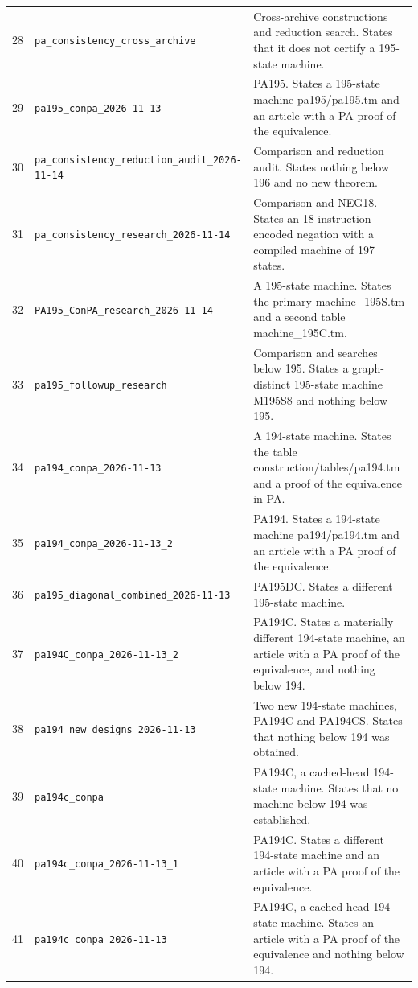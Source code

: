 {\begin{longtable}{rp{}p{}}
28&\nolinkurl{pa_consistency_cross_archive}&Cross-archive constructions and reduction search. States that it does not certify a 195-state machine.\\[3pt]
29&\nolinkurl{pa195_conpa_2026-11-13}&PA195. States a 195-state machine pa195/pa195.tm and an article with a PA proof of the equivalence.\\[3pt]
30&\nolinkurl{pa_consistency_reduction_audit_2026-11-14}&Comparison and reduction audit. States nothing below 196 and no new theorem.\\[3pt]
31&\nolinkurl{pa_consistency_research_2026-11-14}&Comparison and NEG18. States an 18-instruction encoded negation with a compiled machine of 197 states.\\[3pt]
32&\nolinkurl{PA195_ConPA_research_2026-11-14}&A 195-state machine. States the primary machine\_195S.tm and a second table machine\_195C.tm.\\[3pt]
33&\nolinkurl{pa195_followup_research}&Comparison and searches below 195. States a graph-distinct 195-state machine M195S8 and nothing below 195.\\[3pt]
34&\nolinkurl{pa194_conpa_2026-11-13}&A 194-state machine. States the table construction/tables/pa194.tm and a proof of the equivalence in PA.\\[3pt]
35&\nolinkurl{pa194_conpa_2026-11-13_2}&PA194. States a 194-state machine pa194/pa194.tm and an article with a PA proof of the equivalence.\\[3pt]
36&\nolinkurl{pa195_diagonal_combined_2026-11-13}&PA195DC. States a different 195-state machine.\\[3pt]
37&\nolinkurl{pa194C_conpa_2026-11-13_2}&PA194C. States a materially different 194-state machine, an article with a PA proof of the equivalence, and nothing below 194.\\[3pt]
38&\nolinkurl{pa194_new_designs_2026-11-13}&Two new 194-state machines, PA194C and PA194CS. States that nothing below 194 was obtained.\\[3pt]
39&\nolinkurl{pa194c_conpa}&PA194C, a cached-head 194-state machine. States that no machine below 194 was established.\\[3pt]
40&\nolinkurl{pa194c_conpa_2026-11-13_1}&PA194C. States a different 194-state machine and an article with a PA proof of the equivalence.\\[3pt]
41&\nolinkurl{pa194c_conpa_2026-11-13}&PA194C, a cached-head 194-state machine. States an article with a PA proof of the equivalence and nothing below 194.\\[3pt]

\end{longtable}}

